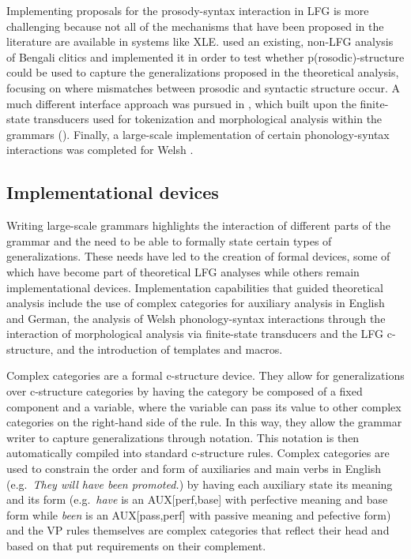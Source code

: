 \documentclass[output=paper,hidelinks]{langscibook}
\begin{document}
Implementing proposals for the prosody-syntax interaction in LFG is more challenging because not all of the mechanisms that have been proposed in the literature are available in systems like XLE. \cite{buttking98} used an existing, non-LFG analysis of Bengali clitics and implemented it in order to test whether p(rosodic)-structure could be used to capture the generalizations proposed in the theoretical analysis, focusing on where mismatches between prosodic and syntactic structure occur. A much different interface approach was pursued in \cite{boegeletal09}, which built upon the finite-state transducers used for tokenization and morphological analysis within the grammars (). Finally, a large-scale implementation of certain phonology-syntax interactions was completed for Welsh \citep{mittendorfsadler06}. 
 
 \subsection{Implementational devices}\label{sec:ImpApp:Devices}
  
 Writing large-scale grammars highlights the interaction of different parts of the grammar and the need to be able to formally state certain types of generalizations. These needs have led to the creation of formal devices, some of which have become part of theoretical LFG analyses while others remain implementational devices.  Implementation capabilities that guided theoretical analysis include the use of complex categories for auxiliary analysis in English and German, the analysis of Welsh phonology-syntax interactions through the interaction of morphological analysis via finite-state transducers and the LFG c-structure, and the introduction of templates and macros.\largerpage
 
 Complex categories \citep{xledoc} are a formal c-structure device. They allow for generalizations over c-structure categories by having the category be composed of a fixed component and a variable, where the variable can pass its value to other complex categories on the right-hand side of the rule. In this way, they allow the grammar writer to capture generalizations through notation. This notation is then automatically compiled into standard c-structure rules. Complex categories are used to constrain the order and form of auxiliaries and main verbs in English (e.g.\ {\em They will have been promoted.}) by having each auxiliary state its meaning and its form (e.g.\ {\em have} is an AUX[perf,base] with perfective meaning and base form while {\em been} is an AUX[pass,perf] with passive meaning and pefective form) and the VP rules themselves are complex categories that reflect their head and based on that put requirements on their complement. 
 
\end{document}
